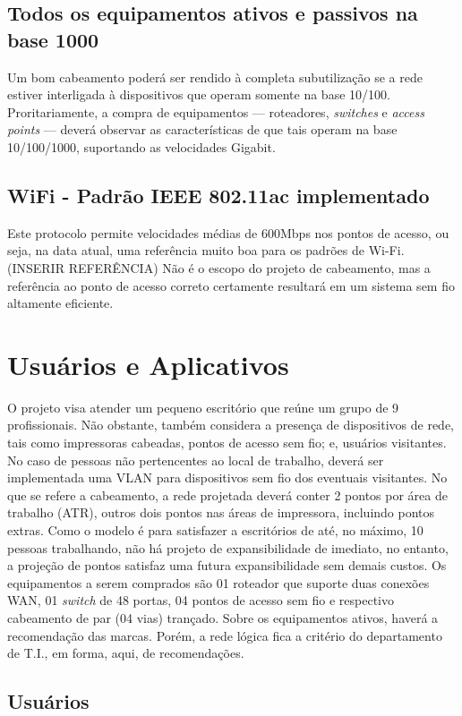\documentclass[	DIV=calc,%
							paper=a4,%
							fontsize=12pt,%
							onecolumn]{scrartcl}	 					%
\begin{document}
\subsection{Todos os equipamentos ativos e passivos na base 1000}
Um bom cabeamento poderá ser rendido à completa subutilização se a rede estiver interligada à dispositivos que operam somente na base 10/100. Proritariamente, a compra de equipamentos --- roteadores, \textit{switches} e \textit{access points} --- deverá observar as características de que tais operam na base 10/100/1000, suportando as velocidades Gigabit.

\subsection{WiFi - Padrão IEEE 802.11ac implementado}
Este protocolo permite velocidades médias de 600Mbps nos pontos de acesso, ou seja, na data atual, uma referência muito boa para os padrões de Wi-Fi. (INSERIR REFERÊNCIA) Não é o escopo do projeto de cabeamento, mas a referência ao ponto de acesso correto certamente resultará em um sistema sem fio altamente eficiente.


\section{Usuários e Aplicativos}
O projeto visa atender um pequeno escritório que reúne um grupo de 9 profissionais. Não obstante, também considera a presença de dispositivos de rede, tais como impressoras cabeadas, pontos de acesso sem fio; e, usuários visitantes. No caso de pessoas não pertencentes ao local de trabalho, deverá ser implementada uma VLAN para dispositivos sem fio dos eventuais visitantes. No que se refere a cabeamento, a rede projetada deverá conter 2 pontos por área de trabalho (ATR), outros dois pontos nas áreas de impressora, incluindo pontos extras. Como o modelo é para satisfazer a escritórios de até, no máximo, 10 pessoas trabalhando, não há projeto de expansibilidade de imediato, no entanto, a projeção de pontos satisfaz uma futura expansibilidade sem demais custos. Os equipamentos a serem comprados são 01 roteador que suporte duas conexões WAN, 01 \textit{switch} de 48 portas, 04 pontos de acesso sem fio e respectivo cabeamento de par (04 vias) trançado. Sobre os equipamentos ativos, haverá a recomendação das marcas. Porém, a rede lógica fica a critério do departamento de T.I., em forma, aqui, de recomendações.

\subsection{Usuários}
\end{document}
